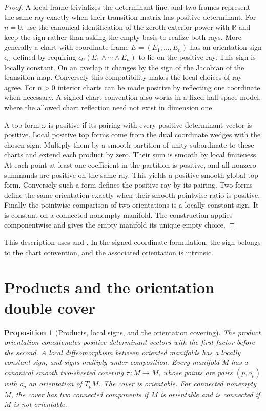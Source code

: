 \documentclass[11pt,oneside,openany]{book}
\newtheorem{proposition}[theorem]{Proposition}
\theoremstyle{definition}
\theoremstyle{remark}
\newcommand{\R}{\mathbb R}
\begin{document}
\begin{proof}
A local frame trivializes the determinant line, and two frames represent the same ray exactly when their transition matrix has positive determinant. For \(n=0\), use the canonical identification of the zeroth exterior power with \(\R\) and keep the sign rather than asking the empty basis to realize both rays. More generally a chart with coordinate frame \(E=(E_1,\ldots,E_n)\) has an orientation sign \(\epsilon_U\) defined by requiring \(\epsilon_U(E_1\wedge\cdots\wedge E_n)\) to lie on the positive ray. This sign is locally constant. On an overlap it changes by the sign of the Jacobian of the transition map. Conversely this compatibility makes the local choices of ray agree. For \(n>0\) interior charts can be made positive by reflecting one coordinate when necessary. A signed-chart convention also works in a fixed half-space model, where the allowed chart reflection need not exist in dimension one.

A top form \(\omega\) is positive if its pairing with every positive determinant vector is positive. Local positive top forms come from the dual coordinate wedges with the chosen sign. Multiply them by a smooth partition of unity subordinate to these charts and extend each product by zero. Their sum is smooth by local finiteness. At each point at least one coefficient in the partition is positive, and all nonzero summands are positive on the same ray. This yields a positive smooth global top form. Conversely such a form defines the positive ray by its pairing. Two forms define the same orientation exactly when their smooth pointwise ratio is positive. Finally the pointwise comparison of two orientations is a locally constant sign. It is constant on a connected nonempty manifold. The construction applies componentwise and gives the empty manifold its unique empty choice.
\end{proof}

This description uses \cite[Chapter 15, pp.~378--388]{lee} and \cite[Section 21]{tu}. In the signed-coordinate formulation, the sign belongs to the chart convention, and the associated orientation is intrinsic.

\section{Products and the orientation double cover}

\begin{proposition}[Products, local signs, and the orientation covering]
\label{p104:M09.02}
The product orientation concatenates positive determinant vectors with the first factor before the second. A local diffeomorphism between oriented manifolds has a locally constant sign, and signs multiply under composition. Every manifold \(M\) has a canonical smooth two-sheeted covering \(\pi:\widetilde M\to M\), whose points are pairs \((p,o_p)\) with \(o_p\) an orientation of \(T_pM\). The cover is orientable. For connected nonempty \(M\), the cover has two connected components if \(M\) is orientable and is connected if \(M\) is not orientable.
\end{proposition}
\end{document}
